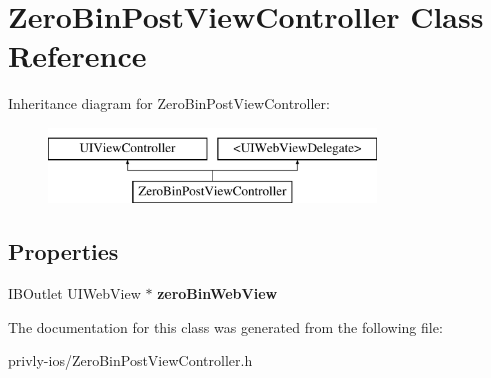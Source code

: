 \hypertarget{interface_zero_bin_post_view_controller}{\section{Zero\-Bin\-Post\-View\-Controller Class Reference}
\label{interface_zero_bin_post_view_controller}
}
Inheritance diagram for Zero\-Bin\-Post\-View\-Controller\-:\begin{figure}[H]
\begin{center}
\leavevmode
\includegraphics[height=2.000000cm]{interface_zero_bin_post_view_controller}
\end{center}
\end{figure}
\subsection*{Properties}
\begin{DoxyCompactItemize}
\item 
\hypertarget{interface_zero_bin_post_view_controller_abe2e097f9dd6ecb3758d8d0698da1377}{I\-B\-Outlet U\-I\-Web\-View $\ast$ {\bfseries zero\-Bin\-Web\-View}}\label{interface_zero_bin_post_view_controller_abe2e097f9dd6ecb3758d8d0698da1377}

\end{DoxyCompactItemize}


The documentation for this class was generated from the following file\-:\begin{DoxyCompactItemize}
\item 
privly-\/ios/Zero\-Bin\-Post\-View\-Controller.\-h\end{DoxyCompactItemize}
